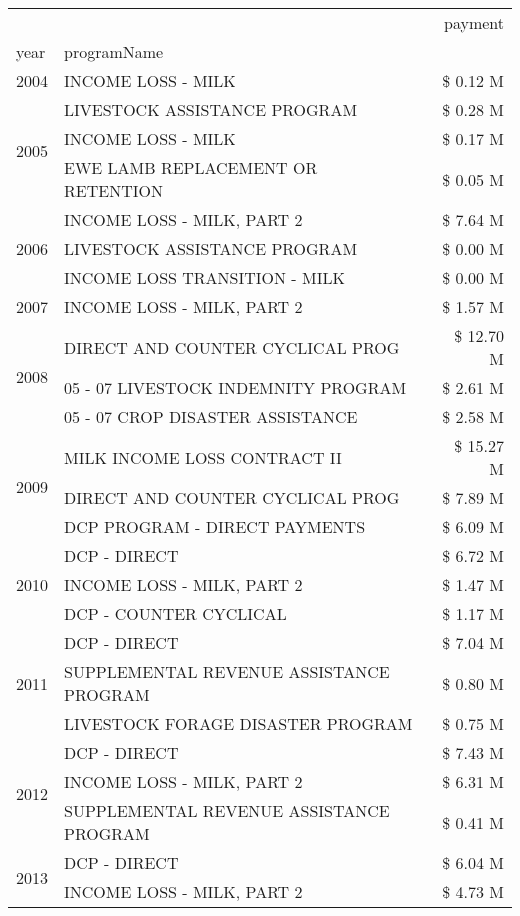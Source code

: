 \begin{tabular}{llr}
\toprule
 &  & payment \\
year & programName &  \\
\midrule
2004 & INCOME LOSS - MILK & \$ 0.12 M \\
\cline{1-3}
\multirow[t]{3}{*}{2005} & LIVESTOCK ASSISTANCE PROGRAM & \$ 0.28 M \\
 & INCOME LOSS - MILK & \$ 0.17 M \\
 & EWE LAMB REPLACEMENT OR RETENTION & \$ 0.05 M \\
\cline{1-3}
\multirow[t]{3}{*}{2006} & INCOME LOSS - MILK, PART 2 & \$ 7.64 M \\
 & LIVESTOCK ASSISTANCE PROGRAM & \$ 0.00 M \\
 & INCOME LOSS TRANSITION - MILK & \$ 0.00 M \\
\cline{1-3}
2007 & INCOME LOSS - MILK, PART 2 & \$ 1.57 M \\
\cline{1-3}
\multirow[t]{3}{*}{2008} & DIRECT AND COUNTER CYCLICAL PROG & \$ 12.70 M \\
 & 05 - 07 LIVESTOCK INDEMNITY PROGRAM & \$ 2.61 M \\
 & 05 - 07 CROP DISASTER ASSISTANCE & \$ 2.58 M \\
\cline{1-3}
\multirow[t]{3}{*}{2009} & MILK INCOME LOSS CONTRACT II & \$ 15.27 M \\
 & DIRECT AND COUNTER CYCLICAL PROG & \$ 7.89 M \\
 & DCP PROGRAM - DIRECT PAYMENTS & \$ 6.09 M \\
\cline{1-3}
\multirow[t]{3}{*}{2010} & DCP - DIRECT & \$ 6.72 M \\
 & INCOME LOSS - MILK, PART 2 & \$ 1.47 M \\
 & DCP - COUNTER CYCLICAL & \$ 1.17 M \\
\cline{1-3}
\multirow[t]{3}{*}{2011} & DCP - DIRECT & \$ 7.04 M \\
 & SUPPLEMENTAL REVENUE ASSISTANCE PROGRAM & \$ 0.80 M \\
 & LIVESTOCK FORAGE DISASTER PROGRAM & \$ 0.75 M \\
\cline{1-3}
\multirow[t]{3}{*}{2012} & DCP - DIRECT & \$ 7.43 M \\
 & INCOME LOSS - MILK, PART 2 & \$ 6.31 M \\
 & SUPPLEMENTAL REVENUE ASSISTANCE PROGRAM & \$ 0.41 M \\
\cline{1-3}
\multirow[t]{3}{*}{2013} & DCP - DIRECT & \$ 6.04 M \\
 & INCOME LOSS - MILK, PART 2 & \$ 4.73 M \\

\end{tabular}
